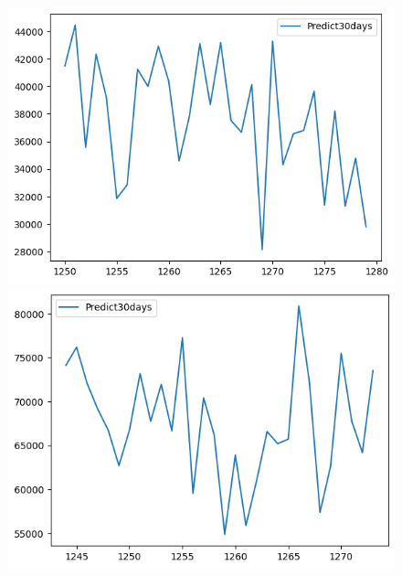 \begin{figure}[H]
\begin{minipage}{0.15\textwidth}
    \centering
    \includegraphics[width=1\textwidth]{resources/chapter-5/predicted/BIDV_ML_9_1_next30days.png}
    \end{minipage}
    \hfill
    \begin{minipage}{0.15\textwidth}
    \centering
    \includegraphics[width=1\textwidth]{resources/chapter-5/predicted/VCB_ML_7_3_next30days.png}
    \end{minipage}
    \hfill
    \begin{minipage}{0.15\textwidth}
    \centering

\end{minipage}
\end{figure}
